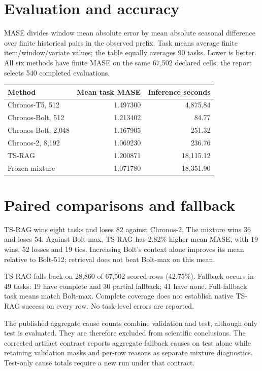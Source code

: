 \documentclass[11pt,a4paper]{article}
\begin{document}
\section{Evaluation and accuracy}
MASE divides window mean absolute error by mean absolute seasonal difference
over finite historical pairs in the observed prefix. Task means average
finite item/window/variate values; the table equally averages 90 tasks.
Lower is better. All six methods have finite MASE on the same 67,502 declared
cells; the report selects 540 completed evaluations.
\begin{center}\begin{tabular}{lrr}\toprule
Method & Mean task MASE & Inference seconds\\\midrule
Chronos-T5, 512 & 1.497300 & 4,875.84\\
Chronos-Bolt, 512 & 1.213402 & 84.77\\
Chronos-Bolt, 2,048 & 1.167905 & 251.32\\
Chronos-2, 8,192 & 1.069230 & 236.76\\
TS-RAG & 1.200871 & 18,115.12\\
Frozen mixture & 1.071780 & 18,351.90\\\bottomrule
\end{tabular}\end{center}
\section{Paired comparisons and fallback}
TS-RAG wins eight tasks and loses 82 against Chronos-2. The mixture wins
36 and loses 54. Against Bolt-max, TS-RAG has 2.82\% higher mean MASE,
with 19 wins, 52 losses and 19 ties. Increasing Bolt's context alone improves
its mean relative to Bolt-512; retrieval does not beat Bolt-max on this mean.

TS-RAG falls back on 28,860 of 67,502 scored rows (42.75\%).
Fallback occurs in 49 tasks: 19 have complete and 30 partial fallback;
41 have none. Full-fallback task means match Bolt-max. Complete coverage
does not establish native TS-RAG success on every row. No task-level errors
are reported.

The published aggregate cause counts combine validation and test, although only
test is evaluated. They are therefore excluded from scientific conclusions.
The corrected artifact contract reports aggregate fallback causes on test alone
while retaining validation masks and per-row reasons as separate mixture
diagnostics. Test-only cause totals require a new run under that contract.
\end{document}

